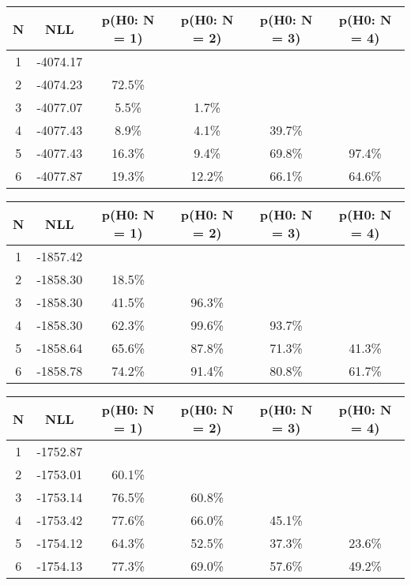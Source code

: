 \begin{table}[htb]
	\begin{center}
{\footnotesize\renewcommand{\arraystretch}{1.4}
		\begin{tabular}{cc||cccc}
			N & NLL & p(H0: N = 1) & p(H0: N = 2) & p(H0: N = 3) & p(H0: N = 4)\\ 
		\hline
1 & -4074.17 & & & & \\
2 & -4074.23 & 72.5\% & & & \\
3 & -4077.07 & 5.5\% & 1.7\% & & \\
4 & -4077.43 & 8.9\% & 4.1\% & 39.7\% & \\
5 & -4077.43 & 16.3\% & 9.4\% & 69.8\% & 97.4\% \\
6 & -4077.87 & 19.3\% & 12.2\% & 66.1\% & 64.6\% \\
	\end{tabular}
		\label{tab:lab}
	}
	\end{center}\end{table}

\begin{table}[htb]
	\begin{center}
{\footnotesize\renewcommand{\arraystretch}{1.4}
		\begin{tabular}{cc||cccc}
			N & NLL & p(H0: N = 1) & p(H0: N = 2) & p(H0: N = 3) & p(H0: N = 4)\\ 
		\hline
1 & -1857.42 & & & & \\
2 & -1858.30 & 18.5\% & & & \\
3 & -1858.30 & 41.5\% & 96.3\% & & \\
4 & -1858.30 & 62.3\% & 99.6\% & 93.7\% & \\
5 & -1858.64 & 65.6\% & 87.8\% & 71.3\% & 41.3\% \\
6 & -1858.78 & 74.2\% & 91.4\% & 80.8\% & 61.7\% \\
	\end{tabular}
		\label{tab:lab}
	}
	\end{center}\end{table}

\begin{table}[htb]
	\begin{center}
{\footnotesize\renewcommand{\arraystretch}{1.4}
		\begin{tabular}{cc||cccc}
			N & NLL & p(H0: N = 1) & p(H0: N = 2) & p(H0: N = 3) & p(H0: N = 4)\\ 
		\hline
1 & -1752.87 & & & & \\
2 & -1753.01 & 60.1\% & & & \\
3 & -1753.14 & 76.5\% & 60.8\% & & \\
4 & -1753.42 & 77.6\% & 66.0\% & 45.1\% & \\
5 & -1754.12 & 64.3\% & 52.5\% & 37.3\% & 23.6\% \\
6 & -1754.13 & 77.3\% & 69.0\% & 57.6\% & 49.2\% \\
	\end{tabular}
		\label{tab:lab}
	}
	\end{center}\end{table}


